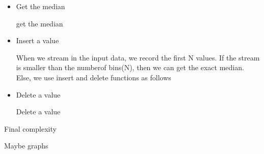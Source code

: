 \begin{itemize}
  \item Get the median
  
  get the median
  
  \item Insert a value
  
  When we stream in the input data, we record the first N values. If the stream is smaller than the numberof bins(N), then we can get the exact median. Else, we use insert and delete functions as follows
 
  \item Delete a value
  
  Delete a value
  
\end{itemize}







Final complexity

Maybe graphs

